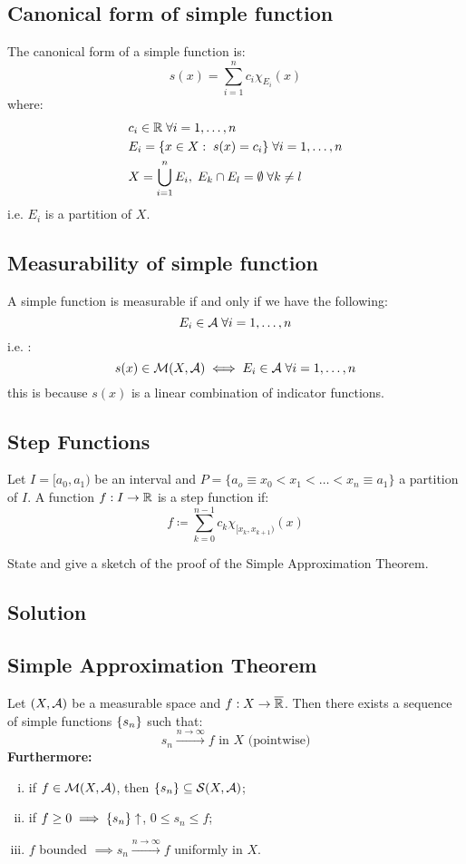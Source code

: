\subsection{Canonical form of simple function}
The canonical form of a simple function is:
\[
    s(x) = \sum_{i=1}^n c_i \chi_{E_i}(x)
\]
where:
\begin{align*}
    & c_i \in \mathbb{R} \; \forall i=1,\dots,n \\
    & E_i = \{ x\in X : \; s(x)=c_i \} \; \forall i=1,\dots,n \\
    & X = \bigcup_{i=1}^n E_i, \; E_k\cap E_l = \emptyset \; \forall k\neq l
\end{align*}
i.e. $E_i$ is a partition of $X$.

\subsection{Measurability of simple function}
A simple function is measurable if and only if we have the following:
\[
    E_i \in \mathcal{A} \; \forall i=1,\dots,n    
\]
i.e. :
\[
    s(x)\in \mathcal{M}(X,\mathcal{A}) \iff E_i \in \mathcal{A} \; \forall i=1,\dots,n  
\]
this is because $s(x)$ is a linear combination of indicator functions.

\subsection{Step Functions}
Let $I=[a_0,a_1)$ be an interval and $P=\{ a_o \equiv x_0 < x_1 < \dots < x_n \equiv a_1 \}$ a partition of $I$. A function $f:I\to\mathbb{R}$ is a step function if:
\[
    f \coloneqq \sum_{k=0}^{n-1} c_k \chi_{[x_k,x_{k+1})} (x)   
\]


\question

State and give a sketch of the proof of the Simple Approximation Theorem.

\subsection*{Solution}

\subsection{Simple Approximation Theorem}
Let $(X,\mathcal{A})$ be a measurable space and $f:X\to\overline{\mathbb{R}}$. Then there exists a sequence of simple functions $\{ s_n \}$ such that:
\[
    s_n \xrightarrow{n\to\infty} f \text{ in } X \text{ (pointwise)}   
\]
\textbf{Furthermore:}
\begin{enumerate}[i)]
    \item if $f\in\mathcal{M}(X,\mathcal{A})$, then $\{ s_n \}\subseteq\mathcal{S}(X,\mathcal{A})$;
    \item if $f\geq 0 \implies \{ s_n \} \uparrow$, $0\leq s_n \leq f$;
    \item $f$ bounded $\implies s_n \xrightarrow{n\to\infty} f$ uniformly in $X$.
\end{enumerate}

